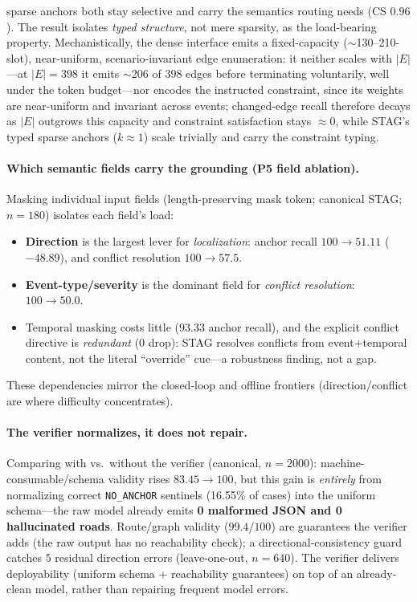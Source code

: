 sparse anchors both stay selective and carry the semantics routing needs (CS $0.96$). The result isolates
\emph{typed structure}, not mere sparsity, as the load-bearing property.
Mechanistically, the dense interface emits a fixed-capacity ($\sim$130--210-slot), near-uniform,
scenario-invariant edge enumeration: it neither scales with $|E|$---at $|E|{=}398$ it emits $\sim$206 of
$398$ edges before terminating voluntarily, well under the token budget---nor encodes the instructed
constraint, since its weights are near-uniform and invariant across events; changed-edge recall therefore
decays as $|E|$ outgrows this capacity and constraint satisfaction stays $\approx 0$, while STAG's typed
sparse anchors ($k\approx 1$) scale trivially and carry the constraint typing.

\paragraph{Which semantic fields carry the grounding (P5 field ablation).}
Masking individual input fields (length-preserving mask token; canonical STAG; $n{=}180$) isolates each
field's load:
\begin{itemize}
  \item \textbf{Direction} is the largest lever for \emph{localization}: anchor recall $100\to 51.11$
        ($-48.89$), and conflict resolution $100\to 57.5$.
  \item \textbf{Event-type/severity} is the dominant field for \emph{conflict resolution}: $100\to 50.0$.
  \item Temporal masking costs little ($93.33$ anchor recall), and the explicit conflict directive is
        \emph{redundant} (0 drop): STAG resolves conflicts from event$+$temporal content, not the literal
        ``override'' cue---a robustness finding, not a gap.
\end{itemize}
These dependencies mirror the closed-loop and offline frontiers (direction/conflict are where difficulty
concentrates).

\paragraph{The verifier normalizes, it does not repair.}
Comparing with vs.\ without the verifier (canonical, $n{=}2000$): machine-consumable/schema validity rises
$83.45\to 100$, but this gain is \emph{entirely} from normalizing correct \texttt{NO\_ANCHOR} sentinels
(16.55\% of cases) into the uniform schema---the raw model already emits \textbf{0 malformed JSON and 0
hallucinated roads}. Route/graph validity ($99.4$/$100$) are guarantees the verifier adds (the raw output
has no reachability check); a directional-consistency guard catches $5$ residual direction errors
(leave-one-out, $n{=}640$). The verifier delivers deployability (uniform schema $+$ reachability
guarantees) on top of an already-clean model, rather than repairing frequent model errors.
